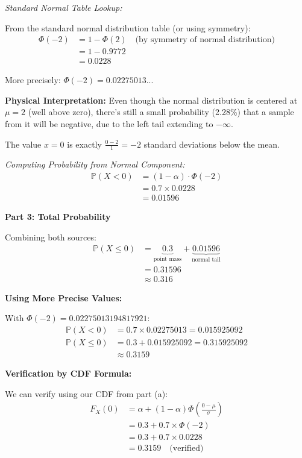 \documentclass[12pt]{article}
\begin{document}
\begin{explanation}
\textit{Standard Normal Table Lookup:}

From the standard normal distribution table (or using symmetry):
\begin{align*}
\Phi(-2) &= 1 - \Phi(2) \quad \text{(by symmetry of normal distribution)} \\
&= 1 - 0.9772 \\
&= 0.0228
\end{align*}

More precisely: \(\Phi(-2) = 0.02275013...\)

\textbf{Physical Interpretation:} Even though the normal distribution is centered at \(\mu = 2\) (well above zero), there's still a small probability (2.28\%) that a sample from it will be negative, due to the left tail extending to \(-\infty\).

The value \(x = 0\) is exactly \(\frac{0-2}{1} = -2\) standard deviations below the mean.

\textit{Computing Probability from Normal Component:}
\begin{align*}
\mathbb{P}(X < 0) &= (1-\alpha) \cdot \Phi(-2) \\
&= 0.7 \times 0.0228 \\
&= 0.01596
\end{align*}

\textbf{Part 3: Total Probability}

Combining both sources:
\begin{align*}
\mathbb{P}(X \leq 0) &= \underbrace{0.3}_{\text{point mass}} + \underbrace{0.01596}_{\text{normal tail}} \\
&= 0.31596 \\
&\approx 0.316
\end{align*}

\textbf{Using More Precise Values:}

With \(\Phi(-2) = 0.02275013194817921\):
\begin{align*}
\mathbb{P}(X < 0) &= 0.7 \times 0.02275013 = 0.015925092 \\
\mathbb{P}(X \leq 0) &= 0.3 + 0.015925092 = 0.315925092 \\
&\approx \boxed{0.3159}
\end{align*}

\textbf{Verification by CDF Formula:}

We can verify using our CDF from part (a):
\begin{align*}
F_X(0) &= \alpha + (1-\alpha) \Phi\left(\frac{0-\mu}{\sigma}\right) \\
&= 0.3 + 0.7 \times \Phi(-2) \\
&= 0.3 + 0.7 \times 0.0228 \\
&= 0.3159 \quad \text{(verified)}
\end{align*}


\end{explanation}
\end{document}
